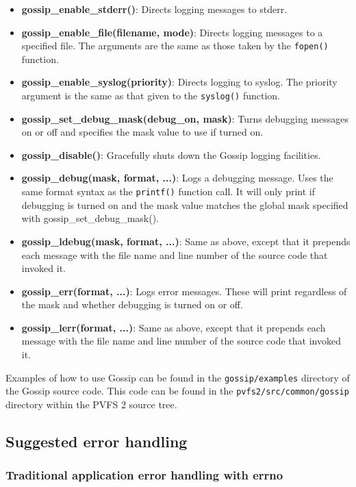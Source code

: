 \documentclass[11pt, letterpaper]{article}
\begin{document}
\begin{itemize}
	\item \textbf{gossip\_enable\_stderr()}:  Directs logging messages to
	stderr.
	\item \textbf{gossip\_enable\_file(filename, mode)}: Directs logging
	messages to a specified file.  The arguments are the same as those
	taken by the {\tt fopen()} function.
	\item \textbf{gossip\_enable\_syslog(priority)}: Directs logging
	to syslog.  The priority argument is the same as that given to the
	{\tt syslog()} function.
	\item \textbf{gossip\_set\_debug\_mask(debug\_on, mask)}: Turns
	debugging messages on or off and specifies the mask value to use if
	turned on.
	\item \textbf{gossip\_disable()}: Gracefully shuts down the Gossip
	logging facilities.
	\item \textbf{gossip\_debug(mask, format, ...)}: Logs a debugging
	message.  Uses the same format syntax as the {\tt printf()} function
	call.  It will only print if debugging is turned on and the mask
	value matches the global mask specified with
	gossip\_set\_debug\_mask().
	\item \textbf{gossip\_ldebug(mask, format, ...)}: Same as above,
	except that it prepends each message with the file name and line
	number of the source code that invoked it.
	\item \textbf{gossip\_err(format, ...)}: Logs error messages.  These
	will print regardless of the mask and whether debugging is turned on
	or off.
	\item \textbf{gossip\_lerr(format, ...)}: Same as above, except that
	it prepends each message with the file name and line number of the
	source code that invoked it.
	
\end{itemize}

Examples of how to use Gossip can be found in the {\tt gossip/examples}
directory of the Gossip source code.  This code can be found in the
{\tt pvfs2/src/common/gossip} directory within the PVFS 2 source tree.

\subsection{Suggested error handling}

\subsubsection{Traditional application error handling with errno}
\end{document}
